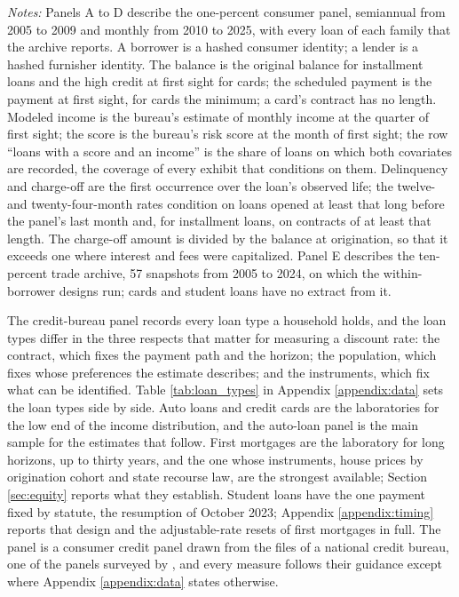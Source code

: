 \begin{table}[H]
\centering
\caption{Summary statistics by loan family}
\label{tab:summary_families}
\small
\resizebox{\textwidth}{!}{}
\vspace{0.5em}
\begin{minipage}{0.96\textwidth}
\noindent \small \textit{Notes:} Panels A to D describe the one-percent consumer panel, semiannual from 2005 to 2009 and monthly from 2010 to 2025, with every loan of each family that the archive reports. A borrower is a hashed consumer identity; a lender is a hashed furnisher identity. The balance is the original balance for installment loans and the high credit at first sight for cards; the scheduled payment is the payment at first sight, for cards the minimum; a card's contract has no length. Modeled income is the bureau's estimate of monthly income at the quarter of first sight; the score is the bureau's risk score at the month of first sight; the row ``loans with a score and an income'' is the share of loans on which both covariates are recorded, the coverage of every exhibit that conditions on them. Delinquency and charge-off are the first occurrence over the loan's observed life; the twelve- and twenty-four-month rates condition on loans opened at least that long before the panel's last month and, for installment loans, on contracts of at least that length. The charge-off amount is divided by the balance at origination, so that it exceeds one where interest and fees were capitalized. Panel E describes the ten-percent trade archive, 57 snapshots from 2005 to 2024, on which the within-borrower designs run; cards and student loans have no extract from it.
\end{minipage}
\end{table}

The credit-bureau panel records every loan type a household holds, and the loan types differ in the three respects that matter for measuring a discount rate: the contract, which fixes the payment path and the horizon; the population, which fixes whose preferences the estimate describes; and the instruments, which fix what can be identified. Table \ref{tab:loan_types} in Appendix \ref{appendix:data} sets the loan types side by side. Auto loans and credit cards are the laboratories for the low end of the income distribution, and the auto-loan panel is the main sample for the estimates that follow. First mortgages are the laboratory for long horizons, up to thirty years, and the one whose instruments, house prices by origination cohort and state recourse law, are the strongest available; Section \ref{sec:equity} reports what they establish. Student loans have the one payment fixed by statute, the resumption of October 2023; Appendix \ref{appendix:timing} reports that design and the adjustable-rate resets of first mortgages in full. The panel is a consumer credit panel drawn from the files of a national credit bureau, one of the panels surveyed by \citet{gibbs_consumer_2025}, and every measure follows their guidance except where Appendix \ref{appendix:data} states otherwise.

